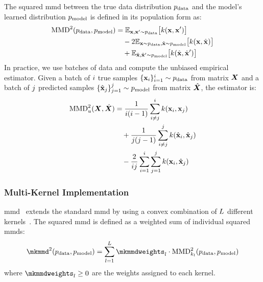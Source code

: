 The squared \gls{mmd} between the true data distribution $p_{\rm{data}}$ and the model's learned distribution $p_{\rm{model}}$ is defined in its population form as:
\begin{align}
    \operatorname{MMD}^2(p_{\rm{data}}, p_{\rm{model}}) &= \mathbb{E}_{{\mathbf{x}}, {\mathbf{x}}' \sim p_{\rm{data}}} \bigl[ k({\mathbf{x}}, {\mathbf{x}}') \bigr] \notag \\
    &\quad - 2 \mathbb{E}_{{\mathbf{x}} \sim p_{\rm{data}}, \hat{{\mathbf{x}}} \sim p_{\rm{model}}} \bigl[ k({\mathbf{x}}, \hat{{\mathbf{x}}}) \bigr] \notag \\
    &\quad + \mathbb{E}_{\hat{{\mathbf{x}}}, \hat{{\mathbf{x}}}' \sim p_{\rm{model}}} \bigl[ k(\hat{{\mathbf{x}}}, \hat{{\mathbf{x}}}') \bigr]
    \label{eq:app:mmd_population}
\end{align}
In practice, we use batches of data and compute the unbiased empirical estimator.
Given a batch of $i$ true samples $\{{\mathbf{x}}_i\}_{i=1}^i \sim p_{\rm{data}}$ from matrix ${\bm{X}}$ and a batch of $j$ predicted samples $\{\hat{{\mathbf{x}}}_j\}_{j=1}^j \sim p_{\rm{model}}$ from matrix $\hat{{\bm{X}}}$, the estimator is:
\begin{align}
    \operatorname{MMD}_u^2({\bm{X}}, \hat{{\bm{X}}}) &= \frac{1}{i(i-1)} \sum_{i \ne j}^{i} k({\mathbf{x}}_i, {\mathbf{x}}_j) \notag \\
    &\quad + \frac{1}{j(j-1)} \sum_{i \ne j}^{j} k(\hat{{\mathbf{x}}}_i, \hat{{\mathbf{x}}}_j) \notag \\
    &\quad - \frac{2}{ij} \sum_{i=1}^{i} \sum_{j=1}^{j} k({\mathbf{x}}_i, \hat{{\mathbf{x}}}_j)
    \label{eq:app:mmd_empirical}
\end{align}

\subsubsection{Multi-Kernel Implementation}
\label{app:metrics:mmd:multi_kernel}

\gls{mmd}~\citep{ren2010multiple,zhu2017maximum} extends the standard \gls{mmd} by using a convex combination of $L$ different kernels~\citep{gretton2012kernel}.
The squared \gls{mmd} is defined as a weighted sum of individual squared \glspl{mmd}:
\begin{equation}
    \mkmmd^2(\pdata, \pmodel) = \sum_{l=1}^{\numkernels} \mkmmdweights_l \cdot \mmd^2_{\kernel_l}(\pdata, \pmodel)
    \label{eq:app:mkmmd}
\end{equation}
where $\mkmmdweights_l \ge 0$ are the weights assigned to each kernel.

